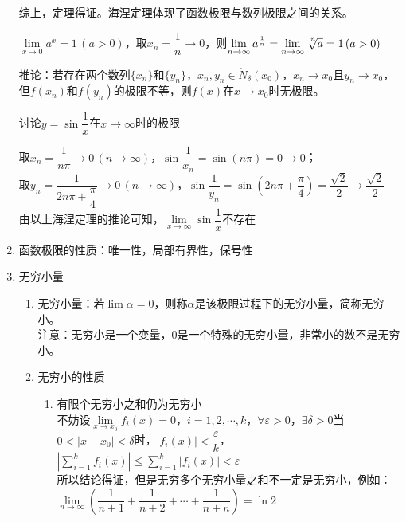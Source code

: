 \documentclass[11pt,fleqn]{book} %
\begin{document}
\begin{enumerate}
\begin{prove}
\begin{enumerate}[label=(\arabic*)]
\end{enumerate}
综上，定理得证。海涅定理体现了函数极限与数列极限之间的关系。
\end{prove}
\begin{example}
$\lim\limits_{x\rightarrow 0}a^x=1\,(a>0)$，取$x_n = \dfrac{1}{n}\rightarrow 0$，则$\lim\limits_{n\rightarrow \infty}a^{\frac{1}{n}} = \lim\limits_{n\rightarrow \infty}\sqrt[\leftroot{-2}\uproot{4}n]{a}=1\,(a>0)$
\end{example}
推论：若存在两个数列$\{x_n\}$和$\{y_n\}$，$x_n, y_n \in \mathring{N}_\delta(x_0)$，$x_n \rightarrow x_0$且$y_n \rightarrow x_0$，但$f(x_n)$和$f(y_n)$的极限不等，则$f(x)$在$x\rightarrow x_0$时无极限。
\begin{example}
 讨论$y = \sin\dfrac{1}{x}$在$x\rightarrow \infty$时的极限
\end{example}
\begin{solution}
取$x_n = \dfrac{1}{n\pi}\rightarrow 0\,(n \rightarrow\infty)$，$\sin \dfrac{1}{x_n}=\sin(n\pi)=0 \rightarrow 0$；\\
取$y_n = \dfrac{1}{2n\pi+\dfrac{\pi}{4}}\rightarrow 0\,(n \rightarrow\infty)$，$\sin \dfrac{1}{y_n}=\sin(2n\pi+\dfrac{\pi}{4})=\dfrac{\sqrt{2}}{2} \rightarrow \dfrac{\sqrt{2}}{2}$\\
由以上海涅定理的推论可知，$\lim\limits_{x \rightarrow \infty} \sin \dfrac{1}{x}$不存在
\end{solution}
\item 函数极限的性质：唯一性，局部有界性，保号性
\item 无穷小量
\begin{enumerate}[label=(\arabic*)]
\item 无穷小量：若$\lim \alpha = 0$，则称$\alpha$是该极限过程下的无穷小量，简称无穷小。\\
注意：无穷小是一个变量，0是一个特殊的无穷小量，非常小的数不是无穷小。
\item 无穷小的性质
\begin{enumerate}[label=(\roman*)]
  \item 有限个无穷小之和仍为无穷小\\
  不妨设$\lim\limits_{x \rightarrow x_0}f_i(x)=0$，$i = 1,2,\cdots,k$，$\forall \varepsilon>0$，$\exists \delta >0$当$0<|x-x_0|<\delta$时，$|f_i(x)|<\dfrac{\varepsilon}{k}$，  $\left|\sum_{i=1}^{k}f_i(x)\right|\leqslant \sum_{i=1}^{k}\left|f_i(x)\right|<\varepsilon$\\
  所以结论得证，但是无穷多个无穷小量之和不一定是无穷小，例如：\\
  $\lim\limits_{n \rightarrow \infty}\left(\dfrac{1}{n+1}+\dfrac{1}{n+2}+\cdots+\dfrac{1}{n+n}\right) = \ln 2$

\end{enumerate}
\end{enumerate}
\end{enumerate}
\end{document}
